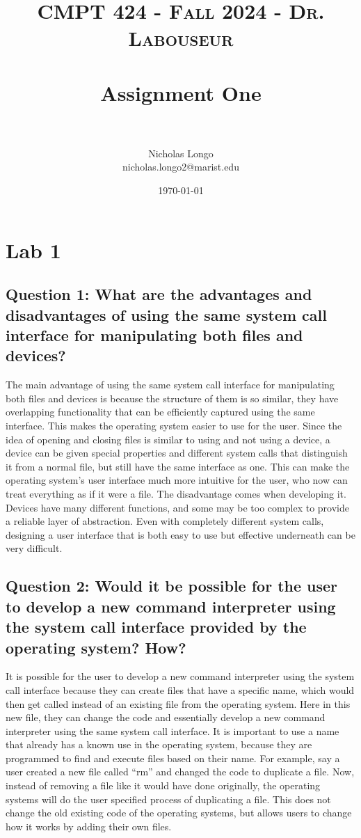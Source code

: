 \documentclass[letterpaper, 10pt,DIV=13]{scrartcl}
\title{	
   \normalfont \normalsize 
   \textsc{CMPT 424 - Fall 2024 - Dr. Labouseur} \\[10pt] %
   \horrule{0.5pt} \\[0.25cm] 	%
   \huge Assignment One  \\     	    %
   \horrule{0.5pt} \\[0.25cm] 	%
}
\author{Nicholas Longo \\ \normalsize nicholas.longo2@marist.edu}
\date{\normalsize\today} 	%
\numberwithin{equation}{section} %
\numberwithin{figure}{section} %
\numberwithin{table}{section} %
\begin{document}
\maketitle %

\section{Lab 1}

\subsection{Question 1: What are the advantages and disadvantages of using the same	system	call interface for	manipulating both files and devices? }
The main advantage of using the same system call interface for manipulating both files and devices is because the structure of them is so similar, they have overlapping functionality that can be efficiently captured using the same interface. This makes the operating system easier to use for the user. Since the idea of opening and closing files is similar to using and not using a device, a device can be given special properties and different system calls that distinguish it from a normal file, but still have the same interface as one. This can make the operating system’s user interface much more intuitive for the user, who now can treat everything as if it were a file. The disadvantage comes when developing it. Devices have many different functions, and some may be too complex to provide a reliable layer of abstraction. Even with completely different system calls, designing a user interface that is both easy to use but effective underneath can be very difficult. 


\subsection{Question 2: Would it be possible for the user to develop a new command interpreter using the system call	interface provided by the operating system? How?}
It is possible for the user to develop a new command interpreter using the system call interface because they can create files that have a specific name, which would then get called instead of an existing file from the operating system. Here in this new file, they can change the code and essentially develop a new command interpreter using the same system call interface. It is important to use a name that already has a known use in the operating system, because they are programmed to find and execute files based on their name. For example, say a user created a new file called “rm” and changed the code to duplicate a file. Now, instead of removing a file like it would have done originally, the operating systems will do the user specified process of duplicating a file. This does not change the old existing code of the operating systems, but allows users to change how it works by adding their own files. 
\end{document}
